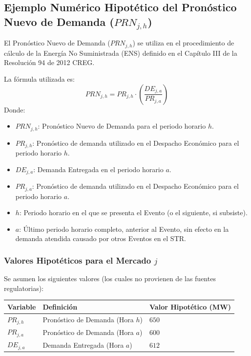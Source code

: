 \documentclass[a5paper]{book}%
\begin{document}
\subsection*{Ejemplo Numérico Hipotético del Pronóstico Nuevo de Demanda ($PRN_{j,h}$)}

El Pronóstico Nuevo de Demanda ($PRN_{j,h}$) se utiliza en el procedimiento de cálculo de la Energía No Suministrada (ENS) definido en el Capítulo III de la Resolución 94 de 2012 CREG.

La fórmula utilizada es:
\begin{equation}
	PRN_{j,h} = PR_{j,h} \cdot \left( \frac{DE_{j,a}}{PR_{j,a}} \right)
\end{equation}
Donde:
\begin{itemize}
	\item $PRN_{j,h}$: Pronóstico Nuevo de Demanda para el periodo horario $h$.
	\item $PR_{j,h}$: Pronóstico de demanda utilizado en el Despacho Económico para el periodo horario $h$.
	\item $DE_{j,a}$: Demanda Entregada en el periodo horario $a$.
	\item $PR_{j,a}$: Pronóstico de demanda utilizado en el Despacho Económico para el periodo horario $a$.
	\item $h$: Periodo horario en el que se presenta el Evento (o el siguiente, si subsiste).
	\item $a$: Último periodo horario completo, anterior al Evento, sin efecto en la demanda atendida causado por otros Eventos en el STR.
\end{itemize}

\subsubsection*{Valores Hipotéticos para el Mercado $j$}
Se asumen los siguientes valores (los cuales no provienen de las fuentes regulatorias):
\begin{center}
	\begin{tabular}{|l|l|p{2cm}|}
		\hline
		\textbf{Variable} & \textbf{Definición} & \textbf{Valor Hipotético (MW)} \\
		\hline
		$PR_{j,h}$ & Pronóstico de Demanda (Hora $h$) & $650$ \\
		$PR_{j,a}$ & Pronóstico de Demanda (Hora $a$) & $600$ \\
		$DE_{j,a}$ & Demanda Entregada (Hora $a$) & $612$ \\
		\hline
	\end{tabular}
\end{center}
\end{document}
